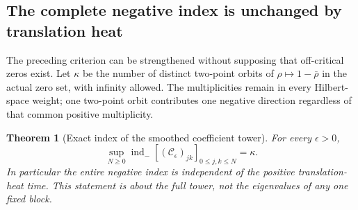 \documentclass[11pt,a4paper]{article}
\newtheorem{theorem}{Theorem}[section]
\theoremstyle{definition}\newtheorem{definition}[theorem]{Definition}
\begin{document}
\subsection{The complete negative index is unchanged by translation heat}
The preceding criterion can be strengthened without supposing that off-critical zeros exist. Let $\kappa$ be the number of distinct two-point orbits of $\rho\mapsto1-\bar\rho$ in the actual zero set, with infinity allowed. The multiplicities remain in every Hilbert-space weight; one two-point orbit contributes one negative direction regardless of that common positive multiplicity.

\begin{theorem}[Exact index of the smoothed coefficient tower]
For every $\epsilon>0$,
\begin{equation}
 \boxed{\sup_{N\ge0}\operatorname{ind}_{-}
       [ (\mathcal C_\epsilon)_{jk}]_{0\le j,k\le N}=\kappa.}
                                                               \tag{PWG24}\label{PWG24}
\end{equation}
In particular the entire negative index is independent of the positive translation-heat time. This statement is about the full tower, not the eigenvalues of any one fixed block.
\end{theorem}
\end{document}
